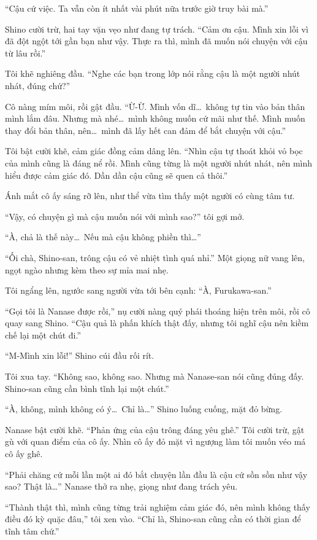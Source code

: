 \documentclass[../main.tex]{subfiles}
\begin{document}
``Cậu cứ việc. Ta vẫn còn ít nhất vài phút nữa trước giờ truy bài mà.''

Shino cười trừ, hai tay vặn vẹo như đang tự trách. ``Cảm ơn cậu. Mình xin lỗi vì đã đột ngột tới gần bạn như vậy. Thực ra thì, mình đã muốn nói chuyện với cậu từ lâu rồi.''

Tôi khẽ nghiêng đầu. ``Nghe các bạn trong lớp nói rằng cậu là một người nhút nhát, đúng chứ?''

Cô nàng mím môi, rồi gật đầu. ``Ừ-Ừ. Mình vốn dĩ\dots\ không tự tin vào bản thân mình lắm đâu. Nhưng mà nhé\dots\ mình không muốn cứ mãi như thế. Mình muốn thay đổi bản thân, nên\dots\ mình đã lấy hết can đảm để bắt chuyện với cậu.''

Tôi bật cười khẽ, cảm giác đồng cảm dâng lên. ``Nhìn cậu tự thoát khỏi vỏ bọc của mình cũng là đáng nể rồi. Mình cũng từng là một người nhút nhát, nên mình hiểu được cảm giác đó. Dần dần cậu cũng sẽ quen cả thôi.''

Ánh mắt cô ấy sáng rỡ lên, như thể vừa tìm thấy một người có cùng tâm tư.

``Vậy, có chuyện gì mà cậu muốn nói với mình sao?'' tôi gợi mở.

``À, chả là thế này\dots\ Nếu mà cậu không phiền thì\dots''

``Ối chà, Shino-san, trông cậu có vẻ nhiệt tình quá nhỉ.'' Một giọng nữ vang lên, ngọt ngào nhưng kèm theo sự mỉa mai nhẹ.

Tôi ngẩng lên, ngước sang người vừa tới bên cạnh: ``À, Furukawa-san.''

``Gọi tôi là Nanase được rồi,'' nụ cười nàng quý phái thoáng hiện trên môi, rồi cô quay sang Shino. ``Cậu quả là phấn khích thật đấy, nhưng tôi nghĩ cậu nên kiềm chế lại một chút đi.''

``M-Mình xin lỗi!'' Shino cúi đầu rối rít.

Tôi xua tay. ``Không sao, không sao. Nhưng mà Nanase-san nói cũng đúng đấy. Shino-san cũng cần bình tĩnh lại một chút.''

``À, không, mình không có ý\dots\ Chỉ là\dots'' Shino luống cuống, mặt đỏ bừng.

Nanase bật cười khẽ. ``Phản ứng của cậu trông đáng yêu ghê.'' Tôi cười trừ, gật gù với quan điểm của cô ấy. Nhìn cô ấy đỏ mặt vì ngượng làm tôi muốn véo má cô ấy ghê.

``Phải chăng cứ mỗi lần một ai đó bắt chuyện lần đầu là cậu cứ sồn sồn như vậy sao? Thật là\dots'' Nanase thở ra nhẹ, giọng như đang trách yêu.

``Thành thật thì, mình cũng từng trải nghiệm cảm giác đó, nên mình không thấy điều đó kỳ quặc đâu,'' tôi xen vào. ``Chỉ là, Shino-san cũng cần có thời gian để tĩnh tâm chứ.''
\end{document}
